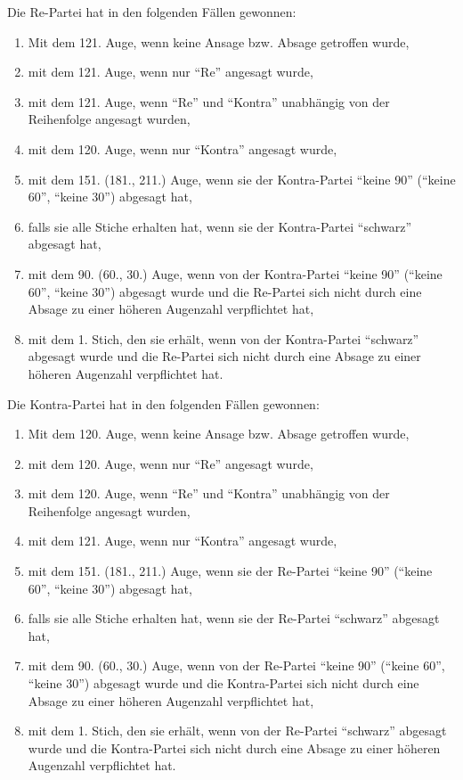 \documentclass{scrartcl}
\begin{document}
Die Re-Partei hat in den folgenden Fällen gewonnen:
\begin{enumerate}
  \item Mit dem 121. Auge, wenn keine Ansage bzw. Absage getroffen wurde,
  \item mit dem 121. Auge, wenn nur "`Re"' angesagt wurde,
  \item mit dem 121. Auge, wenn "`Re"' und "`Kontra"' unabhängig von der Reihenfolge angesagt
    wurden,
  \item mit dem 120. Auge, wenn nur "`Kontra"' angesagt wurde,
  \item mit dem 151. (181., 211.) Auge, wenn sie der Kontra-Partei "`keine 90"' ("`keine 60"', "`keine 30"') abgesagt
    hat,
  \item falls sie alle Stiche erhalten hat, wenn sie der Kontra-Partei "`schwarz"' abgesagt hat,
  \item mit dem 90. (60., 30.) Auge, wenn von der Kontra-Partei "`keine 90"' ("`keine 60"', "`keine 30"') abgesagt
    wurde und die Re-Partei sich nicht durch eine Absage zu einer
    höheren Augenzahl verpflichtet hat,
  \item mit dem 1. Stich, den sie erhält, wenn von der Kontra-Partei "`schwarz"' abgesagt wurde und die
    Re-Partei sich nicht durch eine Absage zu einer höheren Augenzahl
    verpflichtet hat.
\end{enumerate}
Die Kontra-Partei hat in den folgenden Fällen gewonnen:
\begin{enumerate}
  \item Mit dem 120. Auge, wenn keine Ansage bzw. Absage getroffen wurde,
  \item mit dem 120. Auge, wenn nur "`Re"' angesagt wurde,
  \item mit dem 120. Auge, wenn "`Re"' und "`Kontra"' unabhängig von der Reihenfolge angesagt wurden,
  \item mit dem 121. Auge, wenn nur "`Kontra"' angesagt wurde,
  \item mit dem 151. (181., 211.) Auge, wenn sie der Re-Partei "`keine 90"' ("`keine 60"', "`keine 30"') abgesagt hat,
  \item falls sie alle Stiche erhalten hat, wenn sie der Re-Partei "`schwarz"' abgesagt hat,
  \item mit dem 90. (60., 30.) Auge, wenn von der Re-Partei "`keine 90"' ("`keine 60"', "`keine 30"') abgesagt
    wurde und die Kontra-Partei sich nicht durch eine Absage zu einer höheren Augenzahl verpflichtet hat,
  \item mit dem 1. Stich, den sie erhält, wenn von der Re-Partei "`schwarz"' abgesagt wurde und die Kontra-Partei
    sich nicht durch eine Absage zu einer höheren Augenzahl verpflichtet hat.
\end{enumerate}
\end{document}
